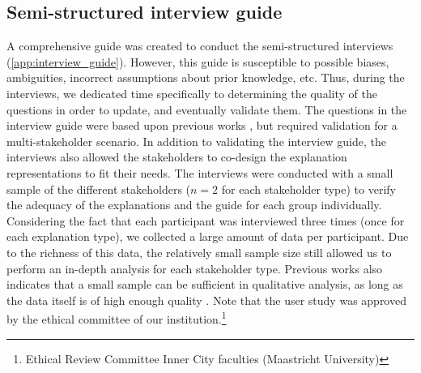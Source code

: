 \subsection{Semi-structured interview guide}
A comprehensive guide was created to conduct the semi-structured interviews (\cref{app:interview_guide}). However, this guide is susceptible to possible biases, ambiguities, incorrect assumptions about prior knowledge, etc. Thus, during the interviews, we dedicated time specifically to determining the quality of the questions in order to update, and eventually validate them. The questions in the interview guide were based upon previous works \cite{chen2005trust,cramer2008effects,kleinerman2018providing,pu2011user}, but required validation for a multi-stakeholder scenario. In addition to validating the interview guide, the interviews also allowed the stakeholders to co-design the explanation representations to fit their needs. The interviews were conducted with a small sample of the different stakeholders ($n = 2$ for each stakeholder type) to verify the adequacy of the explanations and the guide for each group individually. Considering the fact that each participant was interviewed three times (once for each explanation type), we collected a large amount of data per participant. Due to the richness of this data, the relatively small sample size still allowed us to perform an in-depth analysis for each stakeholder type. Previous works also indicates that a small sample can be sufficient in qualitative analysis, as long as the data itself is of high enough quality \cite{dworkin2012sample,morse2000determining}. Note that the user study was approved by the ethical committee of our institution.\footnote{Ethical Review Committee Inner City faculties (Maastricht University)}



